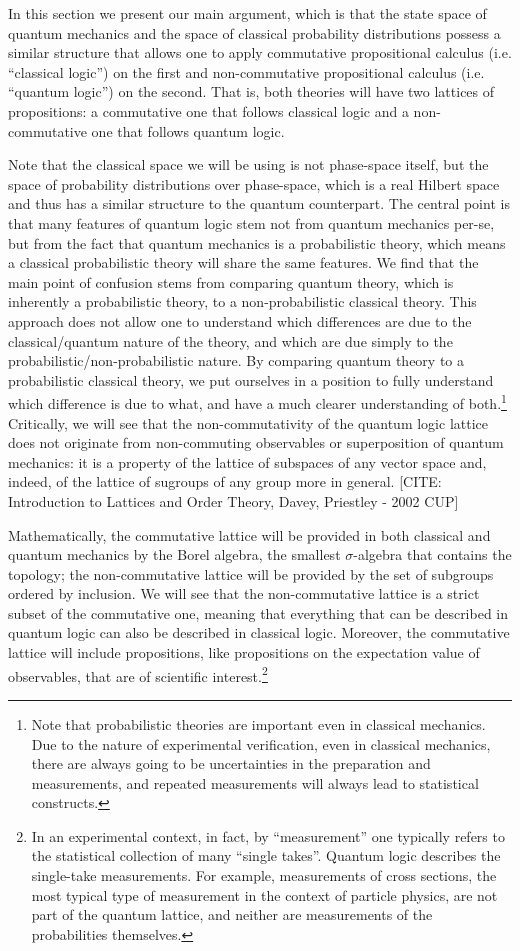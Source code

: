\documentclass[11pt, executivepaper]{article}
\begin{document}
In this section we present our main argument, which is that the state space of quantum mechanics and the space of classical probability distributions possess a similar structure that allows one to apply commutative propositional calculus (i.e. ``classical logic'') on the first and non-commutative propositional calculus (i.e. ``quantum logic'') on the second. That is, both theories will have two lattices of propositions: a commutative one that follows classical logic and a non-commutative one that follows quantum logic.

Note that the classical space we will be using is not phase-space itself, but the space of probability distributions over phase-space, which is a real Hilbert space and thus has a similar structure to the quantum counterpart. The central point is that many features of quantum logic stem not from quantum mechanics per-se, but from the fact that quantum mechanics is a probabilistic theory, which means a classical probabilistic theory will share the same features. We find that the main point of confusion stems from comparing quantum theory, which is inherently a probabilistic theory, to a non-probabilistic classical theory. This approach does not allow one to understand which differences are due to the classical/quantum nature of the theory, and which are due simply to the probabilistic/non-probabilistic nature. By comparing quantum theory to a probabilistic classical theory, we put ourselves in a position to fully understand which difference is due to what, and have a much clearer understanding of both.\footnote{Note that probabilistic theories are important even in classical mechanics. Due to the nature of experimental verification, even in classical mechanics, there are always going to be uncertainties in the preparation and measurements, and repeated measurements will always lead to statistical constructs.} Critically, we will see that the non-commutativity of the quantum logic lattice does not originate from non-commuting observables or superposition of quantum mechanics: it is a property of the lattice of subspaces of any vector space and, indeed, of the lattice of sugroups of any group more in general. [CITE: Introduction to Lattices and Order Theory, Davey, Priestley - 2002 CUP]

Mathematically, the commutative lattice will be provided in both classical and quantum mechanics by the Borel algebra, the smallest $\sigma$-algebra that contains the topology; the non-commutative lattice will be provided by the set of subgroups ordered by inclusion. We will see that the non-commutative lattice is a strict subset of the commutative one, meaning that everything that can be described in quantum logic can also be described in classical logic. Moreover, the commutative lattice will include propositions, like propositions on the expectation value of observables, that are of scientific interest.\footnote{In an experimental context, in fact, by ``measurement'' one typically refers to the statistical collection of many ``single takes''. Quantum logic describes the single-take measurements. For example, measurements of cross sections, the most typical type of measurement in the context of particle physics, are not part of the quantum lattice, and neither are measurements of the probabilities themselves.}
\end{document}
